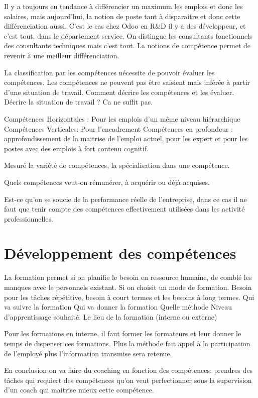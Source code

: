 Il y a toujours eu tendance à différencier un maximum les emplois et donc les salaires, mais aujourd'hui, la notion de poste tant à disparaitre et donc cette différenciation aussi. C'est le cas chez Odoo en R\&D il y a des développeur, et c'est tout, dans le département service. On distingue les consultants fonctionnels des consultants techniques mais c'est tout. La notions de compétence permet de revenir à une meilleur différenciation. 

La classification par les compétences nécessite de pouvoir évaluer les compétences. Les compétences ne peuvent pas être saisient mais inférée à partir d'une situation de travail. Comment décrire les compétences et les évaluer. Décrire la situation de travail ? Ca ne suffit pas.


Compétences Horizontales : Pour les emplois d'un même niveau hiérarchique
Compétences Verticales: Pour l'encadrement
Compétences en profondeur : approfondissement de la maitrise de l'emploi actuel, pour les expert et pour les postes avec des emplois à fort contenu cognitif. 


Mesuré la variété de compétences, la spécialisation dans une compétence. 


Quels compétences veut-on rémunérer, à acquérir ou déjà acquises.

Est-ce qu'on se soucie de la performance réelle de l'entreprise, dans ce cas il ne faut que tenir compte des compétences effectivement utilisées dans les activité professionnelles. 



\section{Développement des compétences } \cite{gestionressourceshumaine2002}
La formation permet si on planifie le besoin en ressource humaine, de comblé les manques avec le personnels existant. 
Si on choisit un mode de formation.
Besoin pour les tâches répétitive, besoin à court termes et les besoins à long termes. 
Qui va suivre la formation
Qui va donner la formation 
Quelle méthode
Niveau d'apprentissage souhaité.
Le lieu de la formation (interne ou externe)

Pour les formations en interne, il faut former les formateurs et leur donner le temps de dispenser ces formations. 
Plus la méthode fait appel à la participation de l'employé plus l'information transmise sera retenue.

En conclusion on va faire du coaching en fonction des compétences: prendres des tâches qui requiert des compétences qu'on veut perfectionner sous la supervision d'un coach qui maitrise mieux cette compétence. 


